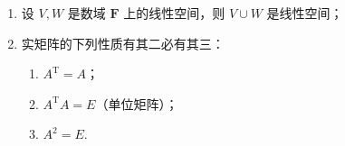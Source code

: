 \begin{enumerate}
\begin{enumerate}
        \item 设 $V, W$ 是数域 $\mathbf{F}$ 上的线性空间，则 $V \cup W$ 是线性空间；

        \item 实矩阵的下列性质有其二必有其三：
        \begin{enumerate}
            \item $A^{\mathrm{T}}=A$；

            \item $A^{\mathrm{T}} A=E$（单位矩阵）；

            \item $A^2=E$.
        \end{enumerate}
    \end{enumerate}
\end{enumerate}

\clearpage
